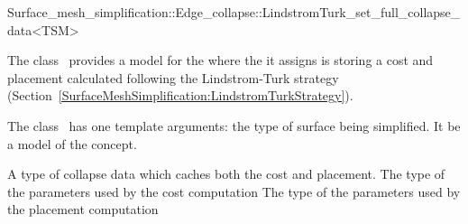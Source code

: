

\begin{ccRefClass}{Surface_mesh_simplification::Edge_collapse::LindstromTurk_set_full_collapse_data<TSM>}


\ccDefinition

The class \ccRefName\ provides a model for the
 where the  it assigns is 
storing a cost and placement calculated following the Lindstrom-Turk strategy
(Section~\ref{SurfaceMeshSimplification:LindstromTurkStrategy}).

The class \ccRefName\ has one template arguments: the type of surface being simplified. 
It be a model of the  concept.

\ccIsModel
{}


\ccTypes
  \ccGlue
  \ccGlue
  {A type of collapse data which caches both the cost and placement.}
  \ccGlue
  {The type of the parameters used by the cost computation}
  \ccGlue
  {The type of the parameters used by the placement computation}
            
\ccCreation
{}  %


\end{ccRefClass}
